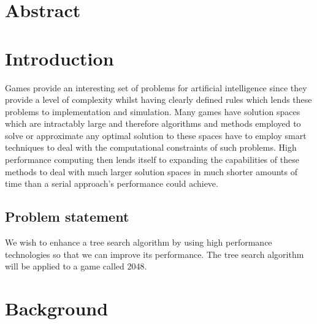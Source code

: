 \documentclass[a4paper]{report}
\begin{document}
\begin{titlepage}

 

\vfill %

\end{titlepage}

\clearpage
\setcounter{page}{1}

\section{Abstract}

\section{Introduction}
Games provide an interesting set of problems for artificial intelligence since they provide a level of complexity whilst having clearly defined rules which lends these problems to implementation and simulation. Many games have solution spaces which are intractably large and therefore algorithms and methods employed to solve or approximate any optimal solution to these spaces have to employ smart techniques to deal with the computational constraints of such problems. High performance computing then lends itself to expanding the capabilities of these methods to deal with much larger solution spaces in much shorter amounts of time than a serial approach’s performance could achieve. \cite{AIModern}

\subsection{Problem statement}
We wish to enhance a tree search algorithm by using high performance technologies so that we can improve its performance. The tree search algorithm will be applied to a game called 2048.

\section{Background}
\end{document}
